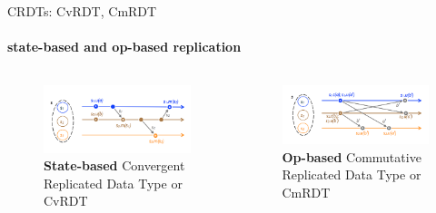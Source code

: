 \documentclass{beamer}
\begin{document}
\begin{frame}{CRDTs: CvRDT, CmRDT}
\framesubtitle{state-based and op-based replication}

\begin{columns}[c]
  \begin{column}{0.4\textwidth}  
    \begin{figure}
      \centering    
	  \includegraphics[scale=0.3]{CRDT-StateBased.png}    
      \caption{\textbf{State-based} Convergent Replicated Data Type or CvRDT}
    \end{figure}
  \end{column}

  \begin{column}{0.4\textwidth}
    \begin{center}
      \begin{figure}
        \includegraphics[scale=0.3]{CRDT-OP-Based.png}
        \caption{\textbf{Op-based} Commutative Replicated Data Type or CmRDT}
      \end{figure}
    \end{center}
  \end{column}
\end{columns}	


\end{frame}
\end{document}
